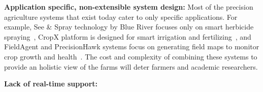 \noindent
\textbf{Application specific, non-extensible system design:}
Most of the precision agriculture systems that exist today cater to only specific applications. For example, See \& Spray technology by Blue River focuses only on smart herbicide spraying~\cite{see&spray}, CropX platform is designed for smart irrigation and fertilizing~\cite{cropx}, and FieldAgent and PrecisionHawk systems focus on generating field maps to monitor crop growth and health~\cite{precisionhawk, fieldagent-sentera}. The cost and complexity of combining these systems to provide an holistic view of the farms will deter farmers and academic researchers. 


\noindent
\textbf{Lack of real-time support:}


